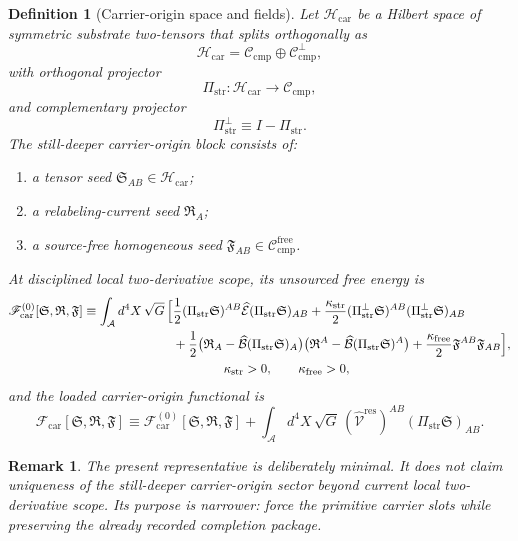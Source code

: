 \documentclass[11pt]{article}
\newcommand{\Sub}{\mathcal A}
\newcommand{\ResidualLift}{\widehat{\mathcal V}^{\mathrm{res}}}
\newcommand{\SubEinLin}{\widehat{\mathcal E}}
\newcommand{\SubGaugeVec}{\widehat{\mathcal B}}
\newcommand{\CompClass}{\mathscr C_{\mathrm{cmp}}}
\newcommand{\CompFree}{\mathscr C_{\mathrm{cmp}}^{\mathrm{free}}}
\newcommand{\CarrierFunctional}{\mathscr F_{\mathrm{car}}}
\newcommand{\FreeStiff}{\kappa_{\mathrm{free}}}
\newcommand{\CarrierClass}{\mathscr H_{\mathrm{car}}}
\newcommand{\CarrierProj}{\Pi_{\mathrm{str}}}
\newcommand{\CarrierPerp}{\Pi_{\mathrm{str}}^{\perp}}
\newcommand{\CarrierGap}{\kappa_{\mathrm{str}}}
\newcommand{\CarrierSeed}{\mathfrak S}
\newcommand{\RelabelSeed}{\mathfrak R}
\newcommand{\FreeSeed}{\mathfrak F}
\newtheorem{definition}{Definition}
\newtheorem{remark}{Remark}
\begin{document}
\begin{definition}[Carrier-origin space and fields]
\label{def:carrier}
Let \(\CarrierClass\) be a Hilbert space of symmetric substrate two-tensors that splits orthogonally as
\begin{equation}
\CarrierClass=\CompClass\oplus \CompClass^\perp,
\label{eq:carrierclass}
\end{equation}
with orthogonal projector
\[
\CarrierProj:\CarrierClass\to\CompClass,
\]
and complementary projector
\[
\CarrierPerp\equiv I-\CarrierProj.
\]
The still-deeper carrier-origin block consists of:
\begin{enumerate}
    \item a tensor seed \(\CarrierSeed_{AB}\in\CarrierClass\);
    \item a relabeling-current seed \(\RelabelSeed_A\);
    \item a source-free homogeneous seed \(\FreeSeed_{AB}\in\CompFree\).
\end{enumerate}
At disciplined local two-derivative scope, its unsourced free energy is
\begin{equation}
\begin{aligned}
\CarrierFunctional^{(0)}[\CarrierSeed,\RelabelSeed,\FreeSeed]
\equiv
\int_{\Sub} d^4X\,\sqrt{G}\,
\Bigl[
&\frac12 (\CarrierProj\CarrierSeed)^{AB}
\SubEinLin(\CarrierProj\CarrierSeed)_{AB}
+\frac{\CarrierGap}{2}(\CarrierPerp\CarrierSeed)^{AB}(\CarrierPerp\CarrierSeed)_{AB}
\\
&+\frac12\bigl(\RelabelSeed_A-\SubGaugeVec(\CarrierProj\CarrierSeed)_A\bigr)
\bigl(\RelabelSeed^A-\SubGaugeVec(\CarrierProj\CarrierSeed)^A\bigr)
+\frac{\FreeStiff}{2}\FreeSeed^{AB}\FreeSeed_{AB}
\Bigr],
\\
&\qquad\qquad \CarrierGap>0,\qquad \FreeStiff>0,
\end{aligned}
\label{eq:car0}
\end{equation}
and the loaded carrier-origin functional is
\begin{equation}
\CarrierFunctional[\CarrierSeed,\RelabelSeed,\FreeSeed]
\equiv
\CarrierFunctional^{(0)}[\CarrierSeed,\RelabelSeed,\FreeSeed]
+
\int_{\Sub} d^4X\,\sqrt{G}\,
(\ResidualLift)^{AB}(\CarrierProj\CarrierSeed)_{AB}.
\label{eq:car}
\end{equation}
\end{definition}

\begin{remark}
The present representative is deliberately minimal. It does not claim uniqueness of the still-deeper carrier-origin sector beyond current local two-derivative scope. Its purpose is narrower: force the primitive carrier slots while preserving the already recorded completion package.
\end{remark}
\end{document}

